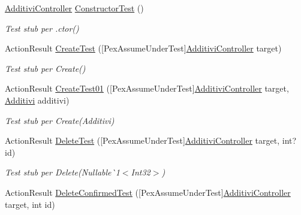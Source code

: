\begin{DoxyCompactItemize}
\item 
\mbox{\hyperlink{class_brew_day2_1_1_controllers_1_1_additivi_controller}{Additivi\+Controller}} \mbox{\hyperlink{class_brew_day2_1_1_controllers_1_1_tests_1_1_additivi_controller_test_a905e010732042693f5c288bb3031f8f5}{Constructor\+Test}} ()
\begin{DoxyCompactList}\small\item\em Test stub per .ctor()\end{DoxyCompactList}\item 
Action\+Result \mbox{\hyperlink{class_brew_day2_1_1_controllers_1_1_tests_1_1_additivi_controller_test_a8bd5de0b81ffb7d5a00f45fd30a014f8}{Create\+Test}} (\mbox{[}Pex\+Assume\+Under\+Test\mbox{]}\mbox{\hyperlink{class_brew_day2_1_1_controllers_1_1_additivi_controller}{Additivi\+Controller}} target)
\begin{DoxyCompactList}\small\item\em Test stub per Create()\end{DoxyCompactList}\item 
Action\+Result \mbox{\hyperlink{class_brew_day2_1_1_controllers_1_1_tests_1_1_additivi_controller_test_aa1296601853176cf8697a69906673e06}{Create\+Test01}} (\mbox{[}Pex\+Assume\+Under\+Test\mbox{]}\mbox{\hyperlink{class_brew_day2_1_1_controllers_1_1_additivi_controller}{Additivi\+Controller}} target, \mbox{\hyperlink{class_brew_day2_1_1_models_1_1_additivi}{Additivi}} additivi)
\begin{DoxyCompactList}\small\item\em Test stub per Create(\+Additivi)\end{DoxyCompactList}\item 
Action\+Result \mbox{\hyperlink{class_brew_day2_1_1_controllers_1_1_tests_1_1_additivi_controller_test_ac12a29de79156d167fa00f1763d6c0c2}{Delete\+Test}} (\mbox{[}Pex\+Assume\+Under\+Test\mbox{]}\mbox{\hyperlink{class_brew_day2_1_1_controllers_1_1_additivi_controller}{Additivi\+Controller}} target, int? id)
\begin{DoxyCompactList}\small\item\em Test stub per Delete(Nullable\`{}1$<$Int32$>$)\end{DoxyCompactList}\item 
Action\+Result \mbox{\hyperlink{class_brew_day2_1_1_controllers_1_1_tests_1_1_additivi_controller_test_a9d3211630bafbbac1bf17c7f015d480a}{Delete\+Confirmed\+Test}} (\mbox{[}Pex\+Assume\+Under\+Test\mbox{]}\mbox{\hyperlink{class_brew_day2_1_1_controllers_1_1_additivi_controller}{Additivi\+Controller}} target, int id)

\end{DoxyCompactItemize}
